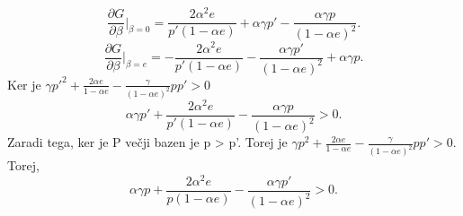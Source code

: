 \documentclass[12pt]{article}
\begin{document}
\begin{equation}
\frac{\partial G}{\partial \beta} |_{\beta=0} = \frac{2\alpha^2 e}{p' (1 - \alpha e)} + \alpha\gamma p' - \frac{\alpha\gamma p }{(1 - \alpha e)^2}.
\end{equation}
\begin{equation}
\frac{\partial G}{\partial \beta} |_{\beta=e} = -\frac{2\alpha^2 e}{p' (1 - \alpha e)}- \frac{\alpha\gamma p' }{(1 - \alpha e)^2} + \alpha\gamma p.
\end{equation}
Ker je $\gamma p'^2 + \frac{2\alpha e}{1 - \alpha e} - \frac{\gamma}{(1 - \alpha e) ^ 2} p p' > 0$
\begin{equation}
\alpha\gamma p' + \frac{2\alpha^2 e}{p'(1 - \alpha e)} - \frac{\alpha\gamma p}{(1 - \alpha e)^2} > 0.
\end{equation}
Zaradi tega, ker je P večji bazen je p > p'. Torej je $\gamma p^2 + \frac{2\alpha e}{1 - \alpha e} - \frac{\gamma}{(1 - \alpha e)^2} p p' > 0$. Torej,
\begin{equation}
\alpha\gamma p + \frac{2\alpha^2 e}{p(1 - \alpha e)} - \frac{\alpha\gamma p'}{(1- \alpha e)^2} > 0.
\end{equation}
\end{document}
